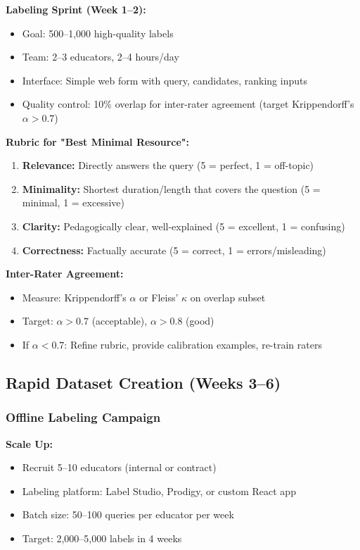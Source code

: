 \documentclass[11pt,letterpaper]{article}
\begin{document}
\textbf{Labeling Sprint (Week 1--2):}
\begin{itemize}
\item Goal: 500--1,000 high-quality labels
\item Team: 2--3 educators, 2--4 hours/day
\item Interface: Simple web form with query, candidates, ranking inputs
\item Quality control: 10\% overlap for inter-rater agreement (target Krippendorff's $\alpha > 0.7$)
\end{itemize}

\textbf{Rubric for "Best Minimal Resource":}
\begin{enumerate}
\item \textbf{Relevance:} Directly answers the query (5 = perfect, 1 = off-topic)
\item \textbf{Minimality:} Shortest duration/length that covers the question (5 = minimal, 1 = excessive)
\item \textbf{Clarity:} Pedagogically clear, well-explained (5 = excellent, 1 = confusing)
\item \textbf{Correctness:} Factually accurate (5 = correct, 1 = errors/misleading)
\end{enumerate}

\textbf{Inter-Rater Agreement:}
\begin{itemize}
\item Measure: Krippendorff's $\alpha$ or Fleiss' $\kappa$ on overlap subset
\item Target: $\alpha > 0.7$ (acceptable), $\alpha > 0.8$ (good)
\item If $\alpha < 0.7$: Refine rubric, provide calibration examples, re-train raters
\end{itemize}

\subsection{Rapid Dataset Creation (Weeks 3--6)}

\subsubsection{Offline Labeling Campaign}

\textbf{Scale Up:}
\begin{itemize}
\item Recruit 5--10 educators (internal or contract)
\item Labeling platform: Label Studio, Prodigy, or custom React app
\item Batch size: 50--100 queries per educator per week
\item Target: 2,000--5,000 labels in 4 weeks
\end{itemize}
\end{document}
